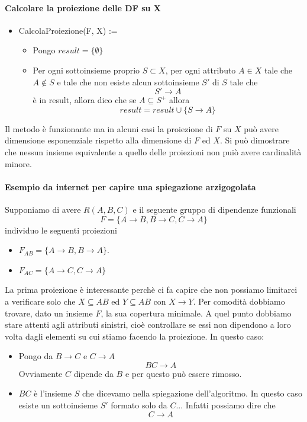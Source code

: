 \paragraph{Calcolare la proiezione delle DF su X}
\begin{itemize}
	\item CalcolaProiezione(F, X) :=
	\begin{itemize}
		\item Pongo $result = \{ \emptyset \}$
		\item Per ogni sottoinsieme proprio $S \subset X$, per ogni attributo $A \in X$ tale che $A \notin S$ e tale che non esiste alcun sottoinsieme $S'$ di $S$ tale che 
		\[S'\to A\]
		è in result, allora dico che se $A \subseteq S^{+}$ allora
		\[result=result \cup \{ S \to A \}\]
	\end{itemize}
\end{itemize}
Il metodo è funzionante ma in alcuni casi la proiezione di $F$ su $X$ può avere dimensione esponenziale rispetto alla dimensione di $F$ ed $X$. Si può dimostrare che nessun insieme equivalente a quello delle proiezioni non puiò avere cardinalità minore.
\paragraph{Esempio da internet per capire una spiegazione arzigogolata} Supponiamo di avere $R(A,B,C)$ e il seguente gruppo di dipendenze funzionali
\[F=\{ A\to B, B \to C, C \to A\}\]
individuo le seguenti proiezioni
\begin{itemize}
	\item $F_{AB}=\{ A \to B, B \to A\}$. 
	\item $F_{AC}=\{ A \to C, C \to A\}$
\end{itemize}
La prima proiezione è interessante perchè ci fa capire che non possiamo limitarci a verificare solo che $X \subseteq AB$ ed $Y \subseteq AB$ con $X \to Y$. Per comodità dobbiamo trovare, dato un insieme $F$, la sua copertura minimale. A quel punto dobbiamo stare attenti agli attributi sinistri, cioè controllare se essi non dipendono a loro volta dagli elementi su cui stiamo facendo la proiezione. In questo caso:
\begin{itemize}
	\item Pongo da $B \to C$ e $C \to A$
	\[BC \to A\]
	Ovviamente $C$ dipende da $B$ e per questo può essere rimosso.
	\item $BC$ è l'insieme $S$ che dicevamo nella spiegazione dell'algoritmo. In questo caso esiste un sottoinsieme $S'$ formato solo da $C$... Infatti possiamo dire che
	\[C \to A\]
\end{itemize}
